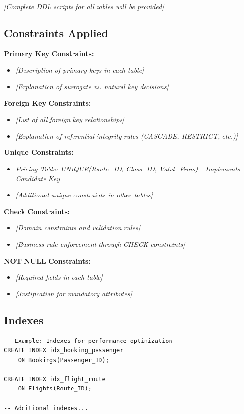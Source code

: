 \documentclass[12pt,a4paper,openany]{report}
\begin{document}
\textit{[Complete DDL scripts for all tables will be provided]}

\subsection{Constraints Applied}

\textbf{Primary Key Constraints:}
\begin{itemize}
    \item \textit{[Description of primary keys in each table]}
    \item \textit{[Explanation of surrogate vs. natural key decisions]}
\end{itemize}

\textbf{Foreign Key Constraints:}
\begin{itemize}
    \item \textit{[List of all foreign key relationships]}
    \item \textit{[Explanation of referential integrity rules (CASCADE, RESTRICT, etc.)]}
\end{itemize}

\textbf{Unique Constraints:}
\begin{itemize}
    \item \textit{Pricing Table: UNIQUE(Route\_ID, Class\_ID, Valid\_From) - Implements Candidate Key}
    \item \textit{[Additional unique constraints in other tables]}
\end{itemize}

\textbf{Check Constraints:}
\begin{itemize}
    \item \textit{[Domain constraints and validation rules]}
    \item \textit{[Business rule enforcement through CHECK constraints]}
\end{itemize}

\textbf{NOT NULL Constraints:}
\begin{itemize}
    \item \textit{[Required fields in each table]}
    \item \textit{[Justification for mandatory attributes]}
\end{itemize}

\subsection{Indexes}

\begin{lstlisting}[caption={Sample Index Creation}]
-- Example: Indexes for performance optimization
CREATE INDEX idx_booking_passenger 
    ON Bookings(Passenger_ID);

CREATE INDEX idx_flight_route 
    ON Flights(Route_ID);

-- Additional indexes...
\end{lstlisting}
\end{document}
